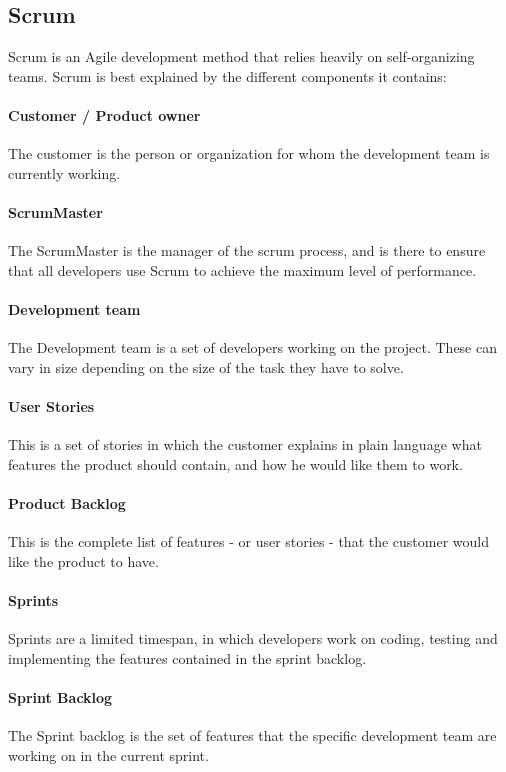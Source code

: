\subsection{Scrum}
Scrum is an Agile development method that relies heavily on self-organizing teams. Scrum is best explained by the different components it contains:


\paragraph{Customer / Product owner}
The customer is the person or organization for whom the development team is currently working.

\paragraph{ScrumMaster}
The ScrumMaster is the manager of the scrum process, and is there to ensure that all developers use Scrum to achieve the maximum level of performance.

\paragraph{Development team}
The Development team is a set of developers working on the project. These can vary in size depending on the size of the task they have to solve.

\paragraph{User Stories}
This is a set of stories in which the customer explains in plain language what features the product should contain, and how he would like them to work.

\paragraph{Product Backlog}
This is the complete list of features - or user stories - that the customer would like the product to have.

\paragraph{Sprints}
Sprints are a limited timespan, in which developers work on coding, testing and implementing the features contained in the sprint backlog.

\paragraph{Sprint Backlog}
The Sprint backlog is the set of features that the specific development team are working on in the current sprint.

